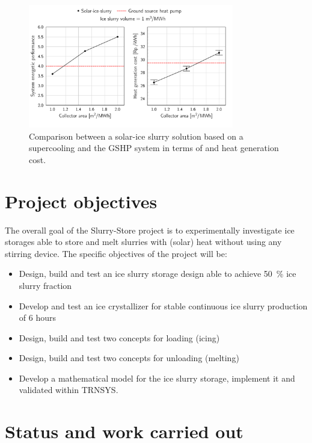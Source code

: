 \documentclass[english]{SFOEYearlyReportEnglish_2018}
\begin{document}
\begin{figure}[!htbp]
    \centering
    \includegraphics[trim={0 0 0 0},clip,width=0.8\textwidth]{figures/cost-Slurry-direct-large-errorBar.pdf}
    \caption{Comparison between a solar-ice slurry solution based on a supercooling and the GSHP system in terms of \si{\spf} and heat generation cost.}
   \label{fig:solar-ice}
\end{figure}


\section{Project objectives}

The overall goal of the Slurry-Store project is to experimentally investigate ice storages able to store and melt slurries with (solar) heat without using any stirring device.
The specific objectives of the project will be:
\begin{itemize}
    \item Design, build and test an ice slurry storage design able to achieve \SI{50}{\%} ice slurry fraction
    \item Develop and test an ice crystallizer for stable continuous ice slurry production of 6 hours
    \item Design, build and test two concepts for loading (icing)
    \item Design, build and test two concepts for unloading (melting)
    \item Develop a mathematical model for the ice slurry storage, implement it and validated within TRNSYS.
\end{itemize}

\section{Status and work carried out}
\end{document}
